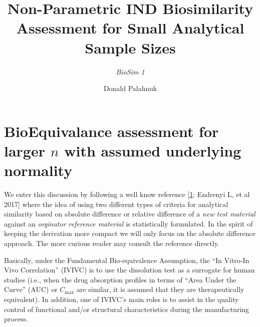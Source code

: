 \documentclass[
  12pt,
  a4paper,
]{article}
\title{Non-Parametric IND Biosimilarity Assessment for Small Analytical
Sample Sizes}
\subtitle{\textit{BioSim 1}}
\author{Donald Palahnuk}
\date{\vhCurrentDate\\
version \vhCurrentVersion\\
\strut \\
InsightHatch: ``Non-Parametric Biosimilarity Assessment for Small
Analytical Sample Sizes when dealing with IND Dossier Data''\\
\textbf{IH-NonParBioSim-v}\textbf{\vhCurrentVersion}}
\numberwithin{equation}{section}
\theoremstyle{plain}
\theoremstyle{definition}
\theoremstyle{remark}
\theoremstyle{note}
\begin{document}
\maketitle

{
\setcounter{tocdepth}{2}
\tableofcontents
}
\hfill\break

\begin{versionhistory}
\end{versionhistory}

\newpage

\setcounter{table}{0}

\hypertarget{bioequivalance-assessment-for-larger-n-with-assumed-underlying-normality}{%
\section{\texorpdfstring{BioEquivalance assessment for larger \(n\) with
assumed underlying
normality}{BioEquivalance assessment for larger n with assumed underlying normality}}\label{bioequivalance-assessment-for-larger-n-with-assumed-underlying-normality}}

We enter this discussion by following a well know reference
{[}\protect\hyperlink{ref-endrenyi_biosimilar_2017}{1}: Endrenyi L, et
al 2017{]} where the idea of using two different types of criteria for
analytical similarity based on absolute difference or relative
difference of a \emph{new test material} against an \emph{orginator
reference material} is statistically formulated. In the spirit of
keeping the derivation more compact we will only focus on the absolute
difference approach. The more curious reader may consult the reference
directly.

Basically, under the Fundamental Bio-equivalence Assumption, the ``In
Vitro-In Vivo Correlation'' (IVIVC) is to use the dissolution test as a
surrogate for human studies (i.e., when the drug absorption profiles in
terms of ``Area Under the Curve'' (AUC) or \(C_{\max }\) are similar, it
is assumed that they are therapeutically equivalent). In addition, one
of IVIVC's main roles is to assist in the quality control of functional
and/or structural characteristics during the manufacturing process.
\end{document}
